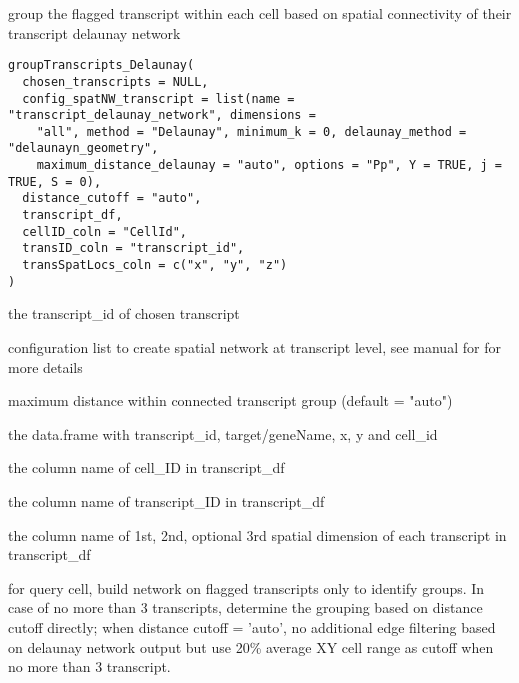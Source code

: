 \documentclass[letterpaper]{book}
\begin{document}
%
\begin{Description}
group the flagged transcript within each cell based on spatial connectivity of their transcript delaunay network
\end{Description}
%
\begin{Usage}
\begin{verbatim}
groupTranscripts_Delaunay(
  chosen_transcripts = NULL,
  config_spatNW_transcript = list(name = "transcript_delaunay_network", dimensions =
    "all", method = "Delaunay", minimum_k = 0, delaunay_method = "delaunayn_geometry",
    maximum_distance_delaunay = "auto", options = "Pp", Y = TRUE, j = TRUE, S = 0),
  distance_cutoff = "auto",
  transcript_df,
  cellID_coln = "CellId",
  transID_coln = "transcript_id",
  transSpatLocs_coln = c("x", "y", "z")
)
\end{verbatim}
\end{Usage}
%
\begin{Arguments}
\begin{ldescription}
\item[\code{chosen\_transcripts}] the transcript\_id of chosen transcript

\item[\code{config\_spatNW\_transcript}] configuration list to create spatial network at transcript level, see manual for  for more details

\item[\code{distance\_cutoff}] maximum distance within connected transcript group (default = "auto")

\item[\code{transcript\_df}] the data.frame with transcript\_id, target/geneName, x, y and cell\_id

\item[\code{cellID\_coln}] the column name of cell\_ID in transcript\_df

\item[\code{transID\_coln}] the column name of transcript\_ID in transcript\_df

\item[\code{transSpatLocs\_coln}] the column name of 1st, 2nd, optional 3rd spatial dimension of each transcript in transcript\_df
\end{ldescription}
\end{Arguments}
%
\begin{Details}
for query cell, build network on flagged transcripts only to identify groups. In case of no more than 3 transcripts, determine the grouping based on distance cutoff directly; when distance cutoff = 'auto', no additional edge filtering based on delaunay network output but use 20\% average XY cell range as cutoff when no more than 3 transcript.
\end{Details}
\end{document}
